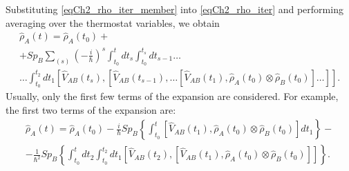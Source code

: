 Substituting \eqref{eqCh2_rho_iter_member} into \eqref{eqCh2_rho_iter} and performing averaging 
over the thermostat variables, we obtain
\begin{eqnarray}
\hat{\rho}_{A}\left(t\right) = 
\hat{\rho}_{A}\left(t_0\right) + 
\nonumber \\
+ Sp_{B} \sum_{\left(s\right)} \left(- \frac{i}{\hbar}\right)^{s}\int_{t_0}^{t} dt_{s} \int_{t_0}^{t_s} dt_{s-1} \dots
\nonumber \\
\dots \int_{t_0}^{t_{2}} dt_1 
\left[\hat{V}_{AB}\left(t_s\right), 
\left[\hat{V}_{AB}\left(t_{s - 1}\right),
\dotsc
\left[\hat{V}_{AB}\left(t_1\right),
\hat{\rho}_{A}\left(t_0\right)
\otimes
\hat{\rho}_{B}\left(t_0\right)
\right]
\dots
\right]
\right].
\label{eqCh2_rho_sequance}
\end{eqnarray}
Usually, only the first few terms
of the expansion are considered. For example, the first two terms of the expansion are:
\begin{eqnarray}
\hat{\rho}_{A}\left(t\right) = 
\hat{\rho}_{A}\left(t_0\right) - \frac{i}{\hbar} Sp_B \left\{
\int_{t_0}^{t} 
\left[\hat{V}_{AB}\left(t_1\right), \hat{\rho}_{A}\left(t_0\right)
\otimes
\hat{\rho}_{B}\left(t_0\right)
\right]d t_1
\right\} -
\nonumber \\
-
\frac{1}{\hbar^2}
Sp_B \left\{
\int_{t_0}^{t}d t_2 
\int_{t_0}^{t_2} d t_1
\left[\hat{V}_{AB}\left(t_2\right), 
\left[\hat{V}_{AB}\left(t_1\right), 
\hat{\rho}_{A}\left(t_0\right)
\otimes
\hat{\rho}_{B}\left(t_0\right)
\right]
\right]
\right\}.
\nonumber
\end{eqnarray}
